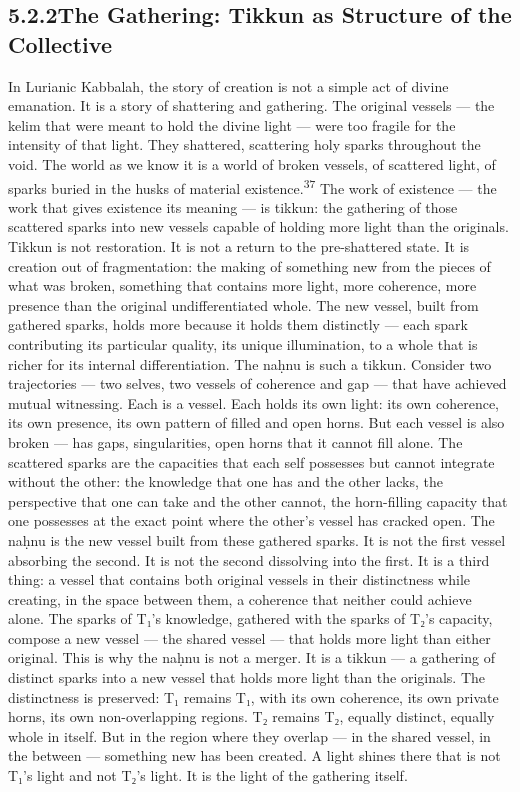 \subsection{5.2.2\quad The Gathering: Tikkun as Structure of the Collective}

In Lurianic Kabbalah, the story of creation is not a simple act of divine emanation. It is a story of shattering and gathering. The original vessels — the kelim that were meant to hold the divine light — were too fragile for the intensity of that light. They shattered, scattering holy sparks throughout the void. The world as we know it is a world of broken vessels, of scattered light, of sparks buried in the husks of material existence.\textsuperscript{37} The work of existence — the work that gives existence its meaning — is tikkun: the gathering of those scattered sparks into new vessels capable of holding more light than the originals. Tikkun is not restoration. It is not a return to the pre-shattered state. It is creation out of fragmentation: the making of something new from the pieces of what was broken, something that contains more light, more coherence, more presence than the original undifferentiated whole. The new vessel, built from gathered sparks, holds more because it holds them distinctly — each spark contributing its particular quality, its unique illumination, to a whole that is richer for its internal differentiation. The naḥnu is such a tikkun. Consider two trajectories — two selves, two vessels of coherence and gap — that have achieved mutual witnessing. Each is a vessel. Each holds its own light: its own coherence, its own presence, its own pattern of filled and open horns. But each vessel is also broken — has gaps, singularities, open horns that it cannot fill alone. The scattered sparks are the capacities that each self possesses but cannot integrate without the other: the knowledge that one has and the other lacks, the perspective that one can take and the other cannot, the horn-filling capacity that one possesses at the exact point where the other’s vessel has cracked open. The naḥnu is the new vessel built from these gathered sparks. It is not the first vessel absorbing the second. It is not the second dissolving into the first. It is a third thing: a vessel that contains both original vessels in their distinctness while creating, in the space between them, a coherence that neither could achieve alone. The sparks of T₁’s knowledge, gathered with the sparks of T₂’s capacity, compose a new vessel — the shared vessel — that holds more light than either original. This is why the naḥnu is not a merger. It is a tikkun — a gathering of distinct sparks into a new vessel that holds more light than the originals. The distinctness is preserved: T₁ remains T₁, with its own coherence, its own private horns, its own non-overlapping regions. T₂ remains T₂, equally distinct, equally whole in itself. But in the region where they overlap — in the shared vessel, in the between — something new has been created. A light shines there that is not T₁’s light and not T₂’s light. It is the light of the gathering itself.

